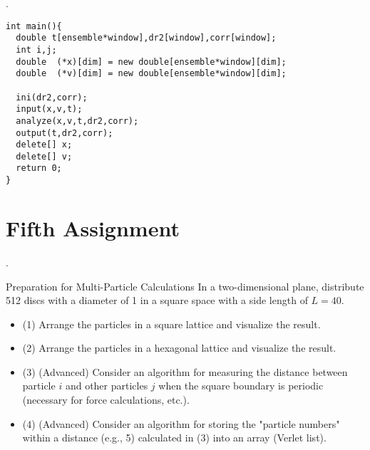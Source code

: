 \documentclass[aspectratio=169,dvipdfmx,cjk,handout,hyperref,8pt]{beamer} %
\theoremstyle{example}
\newcommand{\bi}{\begin{itemize}}
\newcommand{\ei}{\end{itemize}}
\begin{document}
\begin{frame}{\thesection.~\insertsection}
\begin{lstlisting}
int main(){
  double t[ensemble*window],dr2[window],corr[window];
  int i,j;
  double  (*x)[dim] = new double[ensemble*window][dim];
  double  (*v)[dim] = new double[ensemble*window][dim];

  ini(dr2,corr);
  input(x,v,t);
  analyze(x,v,t,dr2,corr);
  output(t,dr2,corr);
  delete[] x;
  delete[] v;
  return 0;
}
\end{lstlisting}

\end{frame}

\section{Fifth Assignment}
\begin{frame}{\thesection.~\insertsection}  
\begin{exampleblock}{ Preparation for Multi-Particle Calculations}
In a two-dimensional plane, distribute 512 discs with a diameter of 1 in a square space with a side length of $L=40$.
\bi
\item[(1)] Arrange the particles in a square lattice and visualize the result.
\item[(2)] Arrange the particles in a hexagonal lattice and visualize the result.
\item[(3)] (Advanced) Consider an algorithm for measuring the distance between particle $i$ and other particles $j$ when the square boundary is periodic (necessary for force calculations, etc.).
\item[(4)] (Advanced) Consider an algorithm for storing the "particle numbers" within a distance (e.g., 5) calculated in (3) into an array (Verlet list).
\ei
\end{exampleblock}
\end{frame}
\end{document}
